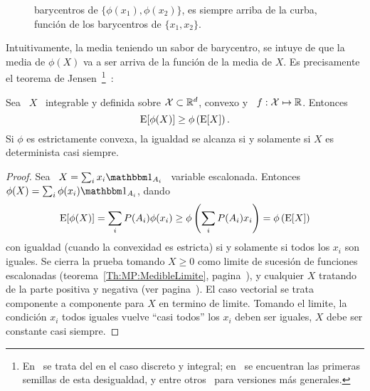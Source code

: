 {\begin{figure}[h!]
{{  barycentros de  $\{ \phi(x_1),  \phi(x_2) \}$,  es siempre arriba  de la  curba, \ie
  funci\'on de los barycentros de $\{ x_1 , x_2 \}$.}}
%
\label{fig:MP:Convexa}
\end{figure}
%
Intuitivamente, la  media teniendo un sabor  de barycentro, se intuye  de que la
media  de $\phi(X)$ va  a ser  arriva de  la funci\'on  de la  media de  $X$. Es
precisamente el  teorema de Jensen~\footnote{En~\cite{Jen06} se trata  del en el
  caso discreto  y integral; en~\cite{Hol89,  Had93} se encuentran  las primeras
  semillas de  esta desigualdad,  y entre otros~\cite{Jes31:I,  Jes31:II, Per74,
    Rud91}  para versiones  m\'as generales.\label{foot:SZ:Jensen}}~\cite{Jen06,
 Fel71, Bre88, AthLah06, Coh13}:
%
\begin{teorema}\label{Th:MP:Jensen}
  Sea \ $X$ \ integrable y definida  sobre $\mathcal{X} \subset \mathbb{R}^d$, convexo y \ $f:
  \mathcal{X} \mapsto \mathbb{R}$. Entonces
  \[
  \operatorname{E}[\phi(X)] \ge \phi\left( \operatorname{E}[X] \right).
  \]
  Si $\phi$ es  estrictamente convexa, la igualdad se alcanza  si y solamente si
  $X$ es determinista casi siempre.
\end{teorema}
%
\begin{proof}
  Sea \ $X = \sum_i x_i  \un_{A_i}$ \ variable escalonada. Entonces \ $\phi(X) =
  \sum_i \phi(x_i) \un_{A_i}$, dando
  \[
  \operatorname{E}[\phi(X)]  = \sum_i  P(A_i)  \phi(x_i) \ge  \phi\left(  \sum_i P(A_i)  x_i
  \right) = \phi\left( \operatorname{E}[X] \right)
  \]
  con igualdad  (cuando la convexidad es  estricta) si y solamente  si todos los
  $x_i$  son iguales.  Se  cierra la  prueba tomando  $X \ge  0$ como  limite de
  sucesi\'on   de   funciones  escalonadas   (teorema~\ref{Th:MP:MedibleLimite},
  pagina~\pageref{Th:MP:MedibleLimite}),  y cualquier $X$  tratando de  la parte
  positiva  y  negativa  (ver  pagina~\pageref{Th:MP:MedibleLimite}).   El  caso
  vectorial  se   trata  componente  a   componente  para  $X$  en   termino  de
  limite. Tomando  el limite, la  condici\'on $x_i$ todos iguales  vuelve ``casi
  todos'' los $x_i$ deben ser iguales, \ie $X$ debe ser constante casi siempre.
\end{proof}

}
